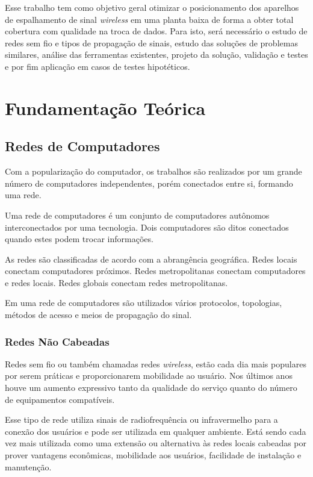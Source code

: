 \documentclass[tc,twoside]{iiufrgs}
\begin{document}
Esse trabalho tem como objetivo geral otimizar o posicionamento dos aparelhos de espalhamento de sinal \textit{wireless} em uma planta baixa de forma a obter total cobertura com qualidade na troca de dados. Para isto, será necessário o estudo de redes sem fio e tipos de propagação de sinais, estudo das soluções de problemas similares, análise das ferramentas existentes, projeto da solução, validação e testes e por fim aplicação em casos de testes hipotéticos.

 

\chapter{Fundamentação Teórica} 

\section{Redes de Computadores}

Com a popularização do computador, os trabalhos são realizados por um grande número de computadores independentes, porém conectados entre si, formando uma rede. \cite{tanenbaum2003redes} %

Uma rede de computadores é um conjunto de computadores autônomos interconectados por uma tecnologia. Dois computadores são ditos conectados quando estes podem trocar informações. \cite{tanenbaum2003redes} %

As redes são classificadas de acordo com a abrangência geográfica. Redes locais conectam computadores próximos. Redes metropolitanas conectam computadores e redes locais. Redes globais conectam redes metropolitanas. \cite{tanenbaum2003redes} %

Em uma rede de computadores são utilizados vários protocolos, topologias, métodos de acesso e meios de propagação do sinal. \cite{brisa1997redes} %

\subsection{Redes Não Cabeadas}

Redes sem fio ou também chamadas redes \textit{wireless}, estão cada dia mais populares por serem práticas e proporcionarem mobilidade ao usuário. Nos últimos anos houve um aumento expressivo tanto da qualidade do serviço quanto do número de equipamentos compatíveis. \cite{rappaport2009comunicacoes} %

Esse tipo de rede utiliza sinais de radiofrequência ou infravermelho para a conexão dos usuários e pode ser utilizada em qualquer ambiente. Está sendo cada vez mais utilizada como uma extensão ou alternativa às redes locais cabeadas por prover vantagens econômicas, mobilidade aos usuários, facilidade de instalação e manutenção. \cite{sanches2005projetando} \cite{torres2015redes} %
\end{document}
